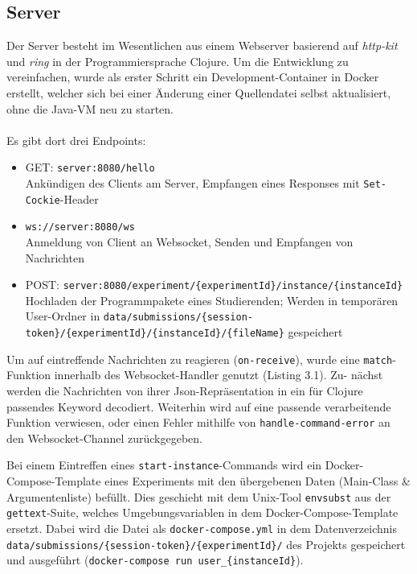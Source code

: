 \subsection{Server}
Der Server besteht im Wesentlichen aus einem Webserver basierend auf \textit{http-kit} und \textit{ring} in der Programmiersprache Clojure.
Um die Entwicklung zu vereinfachen, wurde als erster Schritt ein Development-Container in Docker erstellt, welcher sich bei einer Änderung einer Quellendatei selbst aktualisiert, ohne die Java-VM neu zu starten.
\\\\
Es gibt dort drei Endpoints:
\begin{itemize}
  \item GET: \texttt{server:8080/hello}
    \\ Ankündigen des Clients am Server, Empfangen eines Responses mit \texttt{Set-Cockie}-Header
  \item \texttt{ws://server:8080/ws}
    \\ Anmeldung von Client an Websocket, Senden und Empfangen von Nachrichten
  \item POST: \texttt{server:8080/experiment/\{experimentId\}/instance/\{instanceId\}}
    \\ Hochladen der Programmpakete eines Studierenden; Werden in temporären User-Ordner in \texttt{data/submissions/\{session-token\}/\break\{experimentId\}/\{instanceId\}/\{fileName\}} gespeichert
\end{itemize}
Um auf eintreffende Nachrichten zu reagieren (\texttt{on-receive}), wurde eine \texttt{match}-Funktion innerhalb des Websocket-Handler genutzt (Listing 3.1).
Zu- nächst werden die Nachrichten von ihrer Json-Repräsentation in ein für Clojure passendes Keyword decodiert.
Weiterhin wird auf eine passende verarbeitende Funktion verwiesen, oder einen Fehler mithilfe von \texttt{handle-\break command-error} an den Websocket-Channel zurückgegeben.
\par Bei einem Eintreffen eines \texttt{start-instance}-Commands wird ein Docker-Compose-Template eines Experiments mit den übergebenen Daten (Main-Class \& Argumentenliste) befüllt.
Dies geschieht mit dem Unix-Tool \texttt{envsubst} aus der \texttt{gettext}-Suite, welches Umgebungsvariablen in dem Docker-Compose-Template ersetzt.
Dabei wird die Datei als \texttt{docker-compose.yml} in dem Datenverzeichnis \texttt{data/submissions/\{session-token\}/\{experimentId\}/} des Projekts gespeichert und ausgeführt (\texttt{docker-compose run user\_\break\{instanceId\}}).
